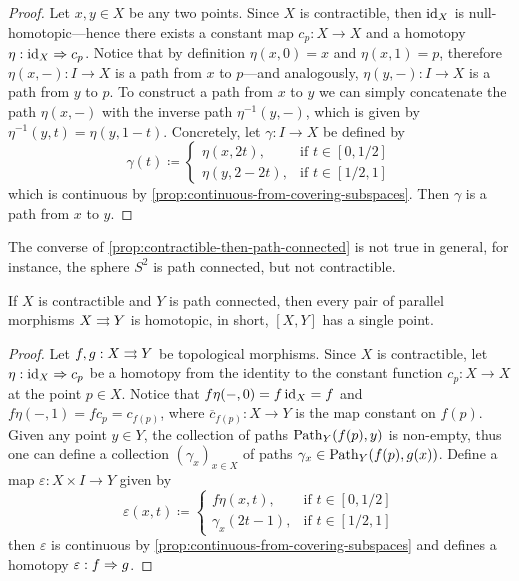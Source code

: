 \begin{proof}
Let \(x, y \in X\) be any two points. Since \(X\) is contractible, then
\(\operatorname{id}_X\) is null-homotopic---hence there exists a constant map \(c_p: X \to X\)
and a homotopy \(\eta: \operatorname{id}_X \Rightarrow c_p\). Notice that by definition \(\eta(x, 0)
= x\) and \(\eta(x, 1) = p\), therefore \(\eta(x, -): I \to X\) is a path from
\(x\) to \(p\)---and analogously, \(\eta(y, -): I \to X\) is a path from \(y\)
to \(p\). To construct a path from \(x\) to \(y\) we can simply concatenate the
path \(\eta(x, -)\) with the inverse path \(\eta^{-1}(y, -)\), which is given by
\(\eta^{-1}(y, t) = \eta(y, 1 - t)\). Concretely, let \(\gamma: I \to X\) be
defined by
\[
\gamma(t) \coloneq
\begin{cases}
  \eta(x, 2t), &\text{if } t \in [0, 1/2] \\
  \eta(y, 2 - 2 t), &\text{if } t \in [1/2, 1]
\end{cases}
\]
which is continuous by \cref{prop:continuous-from-covering-subspaces}. Then
\(\gamma\) is a path from \(x\) to \(y\).
\end{proof}

\begin{remark}
\label{rem:sphere-path-conn-but-not-contractible}
The converse of \cref{prop:contractible-then-path-connected} is not true in
general, for instance, the sphere \(S^2\) is path connected, but not
contractible.
\end{remark}

\begin{corollary}
\label{cor:contractible-to-path-connected-homotopic-maps}
If \(X\) is contractible and \(Y\) is path connected, then every pair of
parallel morphisms \(X \rightrightarrows Y\) is homotopic, in short, \([X, Y]\) has a single
point.
\end{corollary}

\begin{proof}
Let \(f, g: X \rightrightarrows Y\) be topological morphisms. Since \(X\) is contractible,
let \(\eta: \operatorname{id}_X \Rightarrow c_p\) be a homotopy from the identity to the constant
function \(c_p: X \to X\) at the point \(p \in X\). Notice that
\(f \eta(-, 0) = f \operatorname{id}_X = f\) and \(f \eta(-, 1) = f c_p = c_{f(p)}\), where
\(\overline{c}_{f(p)}: X \to Y\) is the map constant on \(f(p)\). Given any point
\(y \in Y\), the collection of paths
\(\operatorname{Path}_Y(f(p), y)\) is non-empty, thus one can define a collection
\((\gamma_x)_{x \in X}\) of paths \(\gamma_x \in \operatorname{Path}_Y(f(p), g(x))\). Define a
map \(\varepsilon: X \times I \to Y\) given by
\[
\varepsilon(x, t) \coloneq
\begin{cases}
  f \eta(x, t), &\text{if } t \in [0, 1/2] \\
  \gamma_x(2t - 1), &\text{if } t \in [1/2, 1]
\end{cases}
\]
then \(\varepsilon\) is continuous by
\cref{prop:continuous-from-covering-subspaces} and defines a homotopy
\(\varepsilon: f \Rightarrow g\).
\end{proof}

